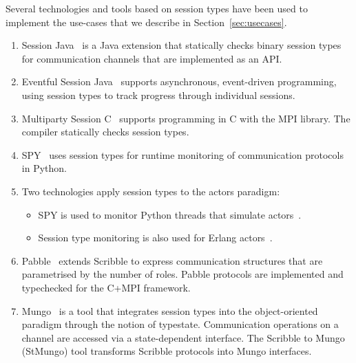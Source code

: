 Several technologies and tools based on session types have been used to implement the use-cases that we describe in Section~\ref{sec:usecases}.
%
\begin{enumerate}
	\item	Session Java~\cite{HU07TYPE-SAFE} is a Java extension
			that statically checks binary session types for communication channels
			that are implemented as an API.

	\item	Eventful Session Java~\cite{event} supports asynchronous, event-driven programming, using session types to track progress through individual sessions.

	\item	Multiparty Session C~\cite{NYH12} supports programming in C with the MPI library. The compiler statically checks session types.

	\item	SPY~\cite{DBLP:conf/rv/NeykovaYH13} uses session types for runtime monitoring of communication protocols in Python.

	\item	Two technologies apply session types to the actors paradigm:
			\begin{itemize}
				\item	SPY is used to monitor Python threads that simulate actors~\cite{DBLP:conf/coordination/NeykovaY14}.
				\item	Session type monitoring is also used for Erlang actors~\cite{SF15}.
			\end{itemize}

	\item	Pabble~\cite{DBLP:conf/pdp/NgY14} extends Scribble to express
			communication structures that are parametrised by the number of roles.
			Pabble protocols are implemented and typechecked for the C+MPI framework.

	\item	Mungo~\cite{mungo} is a tool that integrates session types into the object-oriented
			paradigm through the notion of typestate. Communication
			operations on a channel are accessed via a state-dependent interface.
			The Scribble to Mungo (StMungo) tool transforms Scribble
			protocols into Mungo interfaces.



\end{enumerate}
